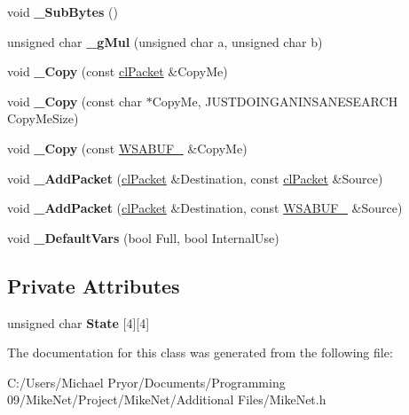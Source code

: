 \begin{DoxyCompactItemize}
\item 
\hypertarget{classcl_packet_ad78de62a24704f5176e67d447f65728d}{
void {\bfseries \_\-SubBytes} ()}
\label{classcl_packet_ad78de62a24704f5176e67d447f65728d}

\item 
\hypertarget{classcl_packet_ab7c15341e68ee6f6b46d86d6f4f05bfd}{
unsigned char {\bfseries \_\-gMul} (unsigned char a, unsigned char b)}
\label{classcl_packet_ab7c15341e68ee6f6b46d86d6f4f05bfd}

\item 
\hypertarget{classcl_packet_a425271952fd9b603d059858f3817a98c}{
void {\bfseries \_\-Copy} (const \hyperlink{classcl_packet}{clPacket} \&CopyMe)}
\label{classcl_packet_a425271952fd9b603d059858f3817a98c}

\item 
\hypertarget{classcl_packet_a86c41d4f9468d07d791e0d26f311ff84}{
void {\bfseries \_\-Copy} (const char $\ast$CopyMe, JUSTDOINGANINSANESEARCH CopyMeSize)}
\label{classcl_packet_a86c41d4f9468d07d791e0d26f311ff84}

\item 
\hypertarget{classcl_packet_ae8ca68424cc5a454200ef8d11bd5bdd6}{
void {\bfseries \_\-Copy} (const \hyperlink{struct_w_s_a_b_u_f__2}{WSABUF\_} \&CopyMe)}
\label{classcl_packet_ae8ca68424cc5a454200ef8d11bd5bdd6}

\item 
\hypertarget{classcl_packet_ac74b60499d386298d526cd17c329ee54}{
void {\bfseries \_\-AddPacket} (\hyperlink{classcl_packet}{clPacket} \&Destination, const \hyperlink{classcl_packet}{clPacket} \&Source)}
\label{classcl_packet_ac74b60499d386298d526cd17c329ee54}

\item 
\hypertarget{classcl_packet_adb6e51d577e2347db968260b5d1c4415}{
void {\bfseries \_\-AddPacket} (\hyperlink{classcl_packet}{clPacket} \&Destination, const \hyperlink{struct_w_s_a_b_u_f__2}{WSABUF\_} \&Source)}
\label{classcl_packet_adb6e51d577e2347db968260b5d1c4415}

\item 
\hypertarget{classcl_packet_a0d9133fe5b78414edbb6460a9a6675e5}{
void {\bfseries \_\-DefaultVars} (bool Full, bool InternalUse)}
\label{classcl_packet_a0d9133fe5b78414edbb6460a9a6675e5}

\end{DoxyCompactItemize}
\subsection*{Private Attributes}
\begin{DoxyCompactItemize}
\item 
\hypertarget{classcl_packet_a77dab2bb7abb755f75f4197c1aeb6415}{
unsigned char {\bfseries State} \mbox{[}4\mbox{]}\mbox{[}4\mbox{]}}
\label{classcl_packet_a77dab2bb7abb755f75f4197c1aeb6415}

\end{DoxyCompactItemize}


The documentation for this class was generated from the following file:\begin{DoxyCompactItemize}
\item 
C:/Users/Michael Pryor/Documents/Programming 09/MikeNet/Project/MikeNet/Additional Files/MikeNet.h\end{DoxyCompactItemize}
